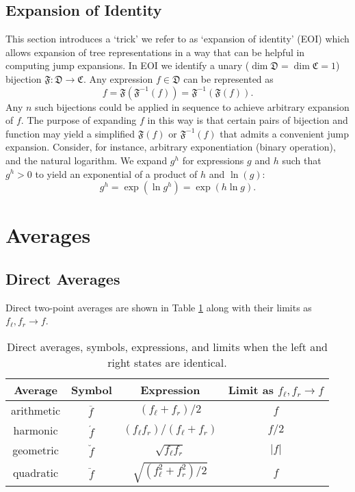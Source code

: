 \documentclass[10pt]{article}
\newcommand{\avg}[1]{\overline{#1}\,}
\newcommand{\harmavg}[1]{\acute{#1}}
\newcommand{\geomavg}[1]{\breve{#1}}
\newcommand{\quadavg}[1]{\ddot{#1}}
\begin{document}
\subsection{Expansion of Identity} \label{sec: expansion of identity}
This section introduces a `trick' we refer to as `expansion of identity' (EOI) which allows expansion of tree representations in a way that can be helpful in computing jump expansions.
In EOI we identify a unary ($\dim\mathfrak{D}=\dim\mathfrak{C}=1$) bijection $\mathfrak{F}:\mathfrak{D}\to\mathfrak{C}$.
Any expression $f\in\mathfrak{D}$ can be represented as
\begin{equation}
	f = \mathfrak{F}(\mathfrak{F}^{-1}(f)) = \mathfrak{F}^{-1}(\mathfrak{F}(f)).
\end{equation}
Any $n$ such bijections could be applied in sequence to achieve arbitrary expansion of $f$.
The purpose of expanding $f$ in this way is that certain pairs of bijection and function may yield a simplified $\mathfrak{F}(f)$ or $\mathfrak{F}^{-1}(f)$ that admits a convenient jump expansion.
Consider, for instance, arbitrary exponentiation (binary operation), and the natural logarithm.
We expand $g^h$ for expressions $g$ and $h$ such that $g^h>0$ to yield an exponential of a product of $h$ and $\ln(g)$:
\begin{equation}
	g^h = \exp(\ln g^h) = \exp(h\ln g).
\end{equation}


\section{Averages} \label{sec: averages}
\subsection{Direct Averages}
Direct two-point averages are shown in Table \ref{tab: direct avgs} along with their limits as $f_\ell,f_r\to f$.
\begin{table}[h]
\caption{Direct averages, symbols, expressions, and limits when the left and right states are identical.}
\begin{center}
\begin{tabular}{c|c|c|c}
	Average & Symbol & Expression & Limit as $f_\ell,f_r\to f$ \\
	\hline
	arithmetic & $\avg{f}$ & $(f_\ell+f_r)/2$ & $f$ \\
	harmonic & $\harmavg{f}$ & $(f_\ell f_r)/(f_\ell+f_r)$ & $f/2$ \\
	geometric & $\geomavg{f}$ & $\sqrt{f_\ell f_r}$ & $|f|$ \\
	quadratic & $\quadavg{f}$ & $\sqrt{(f_\ell^2+f_r^2)/2}$ & $f$ \\
	\hline
\end{tabular}
\end{center}
\label{tab: direct avgs}
\end{table}
\end{document}
